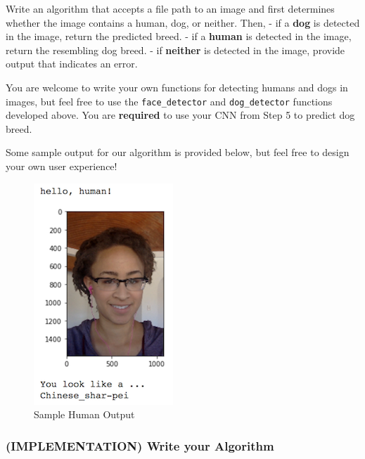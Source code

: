 \documentclass[11pt]{article}
\makeatletter
\def\maxwidth{\ifdim\Gin@nat@width>\linewidth\linewidth
    \else\Gin@nat@width\fi}
\let\Oldincludegraphics\includegraphics
\renewcommand{\includegraphics}[1]{\Oldincludegraphics[width=.8\maxwidth]{#1}}
\makeatother
\begin{document}
Write an algorithm that accepts a file path to an image and first
determines whether the image contains a human, dog, or neither. Then, -
if a \textbf{dog} is detected in the image, return the predicted breed.
- if a \textbf{human} is detected in the image, return the resembling
dog breed. - if \textbf{neither} is detected in the image, provide
output that indicates an error.

You are welcome to write your own functions for detecting humans and
dogs in images, but feel free to use the \texttt{face\_detector} and
\texttt{dog\_detector} functions developed above. You are
\textbf{required} to use your CNN from Step 5 to predict dog breed.

Some sample output for our algorithm is provided below, but feel free to
design your own user experience!

\begin{figure}
\centering
\includegraphics{images/sample_human_output.png}
\caption{Sample Human Output}
\end{figure}

\subsubsection{(IMPLEMENTATION) Write your
Algorithm}\label{implementation-write-your-algorithm}
\end{document}
